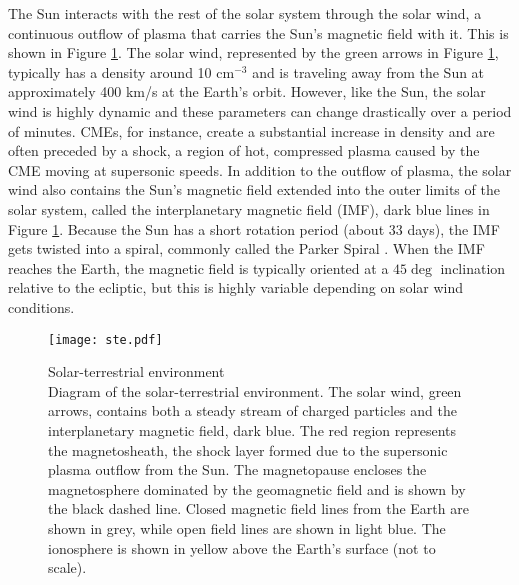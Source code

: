 The Sun interacts with the rest of the solar system through the solar wind, a continuous outflow of plasma that carries the Sun's magnetic field with it.  This is shown in Figure \ref{fig:ste}.  The solar wind, represented by the green arrows in Figure \ref{fig:ste}, typically has a density around 10 cm\(^{-3}\) and is traveling away from the Sun at approximately 400 km/s at the Earth's orbit.  However, like the Sun, the solar wind is highly dynamic and these parameters can change drastically over a period of minutes.  CMEs, for instance, create a substantial increase in density and are often preceded by a shock, a region of hot, compressed plasma caused by the CME moving at supersonic speeds.  In addition to the outflow of plasma, the solar wind also contains the Sun's magnetic field extended into the outer limits of the solar system, called the interplanetary magnetic field (IMF), dark blue lines in Figure \ref{fig:ste}.  Because the Sun has a short rotation period (about 33 days), the IMF gets twisted into a spiral, commonly called the Parker Spiral \citep{Parker1958}.  When the IMF reaches the Earth, the magnetic field is typically oriented at a \(45\deg\) inclination relative to the ecliptic, but this is highly variable depending on solar wind conditions.

\begin{figure}
	\centering
	\texttt{[image: ste.pdf]}
	\caption[Solar-terrestrial environment]{{\:}Solar-terrestrial environment\\ Diagram of the solar-terrestrial environment.  The solar wind, green arrows, contains both a steady stream of charged particles and the interplanetary magnetic field, dark blue.  The red region represents the magnetosheath, the shock layer formed due to the supersonic plasma outflow from the Sun.  The magnetopause encloses the magnetosphere dominated by the geomagnetic field and is shown by the black dashed line.  Closed magnetic field lines from the Earth are shown in grey, while open field lines are shown in light blue.  The ionosphere is shown in yellow above the Earth's surface (not to scale).}
	\label{fig:ste}
\end{figure}

